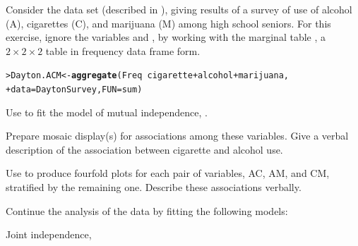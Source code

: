 \documentclass[10pt]{report}\usepackage[]{graphicx}\usepackage[]{color}
\makeatletter
\newcommand{\hlopt}[1]{\textcolor[rgb]{0,0,0}{#1}}%
\newcommand{\hlstd}[1]{\textcolor[rgb]{0.345,0.345,0.345}{#1}}%
\newcommand{\hlkwb}[1]{\textcolor[rgb]{0.69,0.353,0.396}{#1}}%
\newcommand{\hlkwc}[1]{\textcolor[rgb]{0.333,0.667,0.333}{#1}}%
\newcommand{\hlkwd}[1]{\textcolor[rgb]{0.737,0.353,0.396}{\textbf{#1}}}%
\newenvironment{kframe}{%
 \def\at@end@of@kframe{}%
 \ifinner\ifhmode%
  \def\at@end@of@kframe{\end{minipage}}%
  \begin{minipage}{\columnwidth}%
 \fi\fi%
 \def\FrameCommand##1{\hskip\@totalleftmargin \hskip-\fboxsep
 \colorbox{shadecolor}{##1}\hskip-\fboxsep
     \hskip-\linewidth \hskip-\@totalleftmargin \hskip\columnwidth}%
 \MakeFramed {\advance\hsize-\width
   \@totalleftmargin\z@ \linewidth\hsize
   \@setminipage}}%
 {\par\unskip\endMakeFramed%
 \at@end@of@kframe}
\newenvironment{knitrout}{}{} %
\renewenvironment{knitrout}{\small\renewcommand{\baselinestretch}{.85}}{} %
\makeatother
\begin{document}
\begin{Exercises}

  \exercise Consider the data set  (described in ), giving
  results of a survey of use of alcohol (A), cigarettes (C), and marijuana (M) among high school
  seniors.  For this exercise, ignore the variables  and , by working with the
  marginal table , a $2 \times 2 \times 2$ table in frequency data frame form.
\begin{knitrout}\footnotesize
{}\color{fgcolor}\begin{kframe}
\begin{alltt}
\hlstd{> }\hlstd{Dayton.ACM} \hlkwb{<-} \hlkwd{aggregate}\hlstd{(Freq} \hlopt{~} \hlstd{cigarette} \hlopt{+} \hlstd{alcohol} \hlopt{+} \hlstd{marijuana,}
\hlstd{+ }                        \hlkwc{data}\hlstd{=DaytonSurvey,} \hlkwc{FUN}\hlstd{=sum)}
\end{alltt}
\end{kframe}
\end{knitrout}
  \begin{enumerate*}
  
    \item Use  to fit the model of mutual independence, .
    \begin{ans}
    \end{ans}
    
    \item Prepare mosaic display(s) for associations among these variables.
    Give a verbal description of the association between cigarette and alcohol use.
    \begin{ans}
    \end{ans}
    
    \item Use  to produce fourfold plots for each pair of variables,
    AC, AM, and CM, stratified by the remaining one.
    Describe these associations verbally.
    \begin{ans}
    \end{ans}
    
  \end{enumerate*}
  
  \exercise Continue the analysis of the  data by fitting the following models:
  \begin{enumerate*}
    \item Joint independence, 
    \begin{ans}
    \end{ans}
    

\end{enumerate*}
\end{Exercises}
\end{document}
